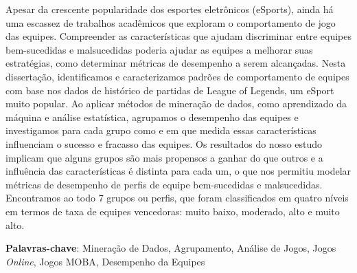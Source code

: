 Apesar da crescente popularidade dos esportes eletrônicos (eSports), ainda há uma escassez de trabalhos acadêmicos que exploram o comportamento de jogo das equipes. Compreender as características que ajudam discriminar entre equipes bem-sucedidas e malsucedidas poderia ajudar as equipes a melhorar suas estratégias, como determinar métricas de desempenho a serem alcançadas. Nesta dissertação, identificamos e caracterizamos padrões de comportamento de equipes com base nos dados de histórico de partidas de League of Legends, um eSport muito popular. Ao aplicar métodos de mineração de dados, como aprendizado da máquina e análise estatística, agrupamos o desempenho das equipes e investigamos para cada grupo como e em que medida essas características influenciam o sucesso e fracasso das equipes. Os resultados do nosso estudo implicam que alguns grupos são mais propensos a ganhar do que outros e a influência das características é distinta para cada um, o que nos permitiu modelar métricas de desempenho de perfis de equipe bem-sucedidas e malsucedidas. Encontramos ao todo 7 grupos ou perfis, que foram classificados em quatro níveis em termos de taxa de equipes vencedoras: muito baixo, moderado, alto e muito alto.

\textbf{Palavras-chave}: Mineração de Dados, Agrupamento, Análise de Jogos, Jogos \textit{Online}, Jogos MOBA, Desempenho da Equipes
